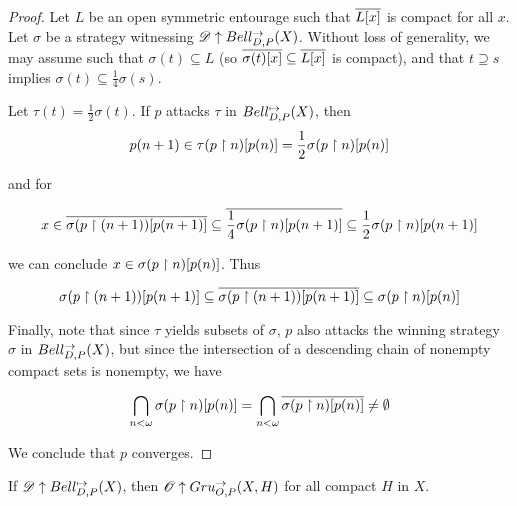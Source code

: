 \begin{proof}
  Let $L$ be an open symmetric entourage such that $\overline{L[x]}$ is compact
  for all $x$.
  Let $\sigma$ be a strategy witnessing $\mathscr{D}\uparrow Bell_{D,P}^{\to}(X)$.
  Without loss of generality, we may assume such that
  $\sigma(t)\subseteq L$
  (so $\overline{\sigma(t)[x]}\subseteq\overline{L[x]}$ is compact), and that
  $t \supseteq s$ implies $\sigma(t)\subseteq \frac{1}{4}\sigma(s)$.

  Let $\tau(t)=\frac{1}{2}\sigma(t)$. If $p$ attacks $\tau$
  in $Bell_{D,P}^{\mapsto}(X)$, then
    \[
      p(n+1)
        \in
      \tau(p\restriction n)[p(n)]
        =
      \frac{1}{2}\sigma(p\restriction n)[p(n)]
    \]

  \noindent and for

    \[
      x
        \in
      \overline{\sigma(p\restriction (n+1))[p(n+1)]}
        \subseteq
      \overline{\frac{1}{4}\sigma(p\restriction n)[p(n+1)]}
        \subseteq
      \frac{1}{2}\sigma(p\restriction n)[p(n+1)]
    \]

  \noindent we can conclude $x\in\sigma(p\restriction n)[p(n)]$. Thus

    \[
      \sigma(p\restriction (n+1))[p(n+1)]
        \subseteq
      \overline{\sigma(p\restriction (n+1))[p(n+1)]}
        \subseteq
      \sigma(p\restriction n)[p(n)]
    \]

  Finally, note that since $\tau$ yields subsets of $\sigma$, $p$ also attacks
  the winning strategy $\sigma$ in $Bell_{D,P}^{\to}(X)$, but since the intersection
  of a descending chain of nonempty compact sets is nonempty, we have

    \[
      \bigcap_{n<\omega} \sigma(p\restriction n)[p(n)]
        =
      \bigcap_{n<\omega} \overline{\sigma(p\restriction n)[p(n)]}
        \not=
      \emptyset
    \]

  We conclude that $p$ converges.
\end{proof}


\begin{thm}
  If $\mathscr{D}\uparrow Bell_{D,P}^{\mapsto}(X)$, then $\mathscr{O}\uparrow Gru_{O,P}^{\to}(X,H)$ for
  all compact $H$ in $X$.
\end{thm}


